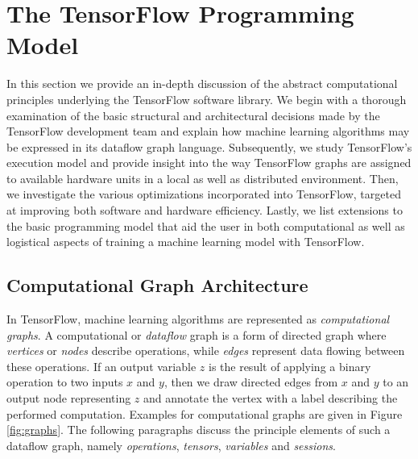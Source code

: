 \section{The TensorFlow Programming Model}\label{sec:model}

In this section we provide an in-depth discussion of the abstract computational
principles underlying the TensorFlow software library. We begin with a thorough
examination of the basic structural and architectural decisions made by the
TensorFlow development team and explain how machine learning algorithms may be
expressed in its dataflow graph language. Subsequently, we study TensorFlow's
execution model and provide insight into the way TensorFlow graphs are assigned
to available hardware units in a local as well as distributed environment. Then,
we investigate the various optimizations incorporated into TensorFlow, targeted
at improving both software and hardware efficiency. Lastly, we list extensions
to the basic programming model that aid the user in both computational as well
as logistical aspects of training a machine learning model with TensorFlow.

\subsection{Computational Graph Architecture}\label{sec:model-graphs}

In TensorFlow, machine learning algorithms are represented as
\emph{computational graphs}. A computational or \emph{dataflow} graph is a form
of directed graph where \emph{vertices} or \emph{nodes} describe operations,
while \emph{edges} represent data flowing between these operations. If an output
variable $z$ is the result of applying a binary operation to two inputs $x$ and
$y$, then we draw directed edges from $x$ and $y$ to an output node representing
$z$ and annotate the vertex with a label describing the performed
computation. Examples for computational graphs are given in Figure
\ref{fig:graphs}. The following paragraphs discuss the principle elements of
such a dataflow graph, namely \emph{operations}, \emph{tensors},
\emph{variables} and \emph{sessions}.

